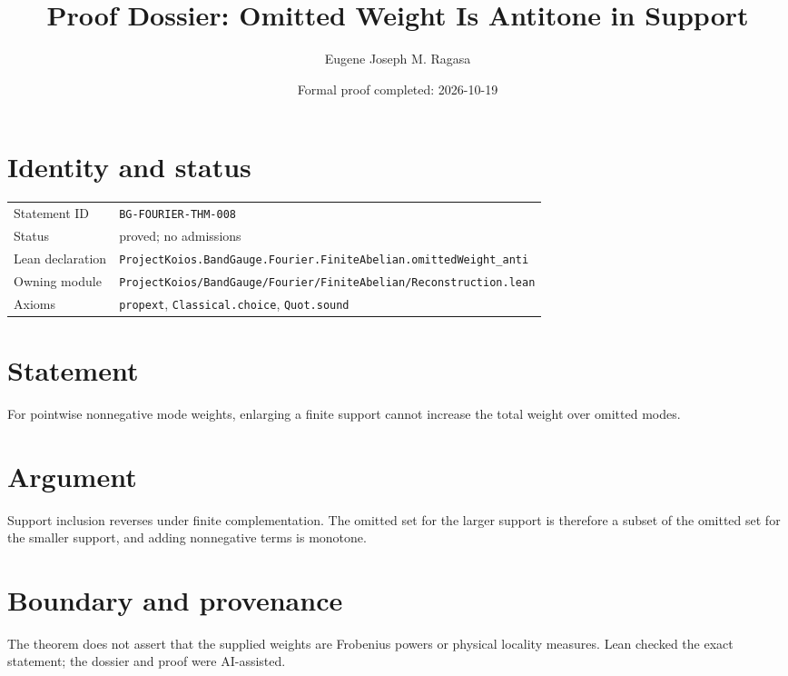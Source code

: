 \documentclass[11pt]{article}
\title{Proof Dossier: Omitted Weight Is Antitone in Support}
\author{Eugene Joseph M. Ragasa}
\date{Formal proof completed: 2026-10-19}
\begin{document}
\maketitle
\section{Identity and status}
\begin{tabularx}{\textwidth}{@{}lX@{}}\toprule
Statement ID & \texttt{BG-FOURIER-THM-008} \\
Status & proved; no admissions \\
Lean declaration & \texttt{ProjectKoios.BandGauge.Fourier.FiniteAbelian.}\newline\texttt{omittedWeight\_anti} \\
Owning module & \texttt{ProjectKoios/BandGauge/Fourier/FiniteAbelian/Reconstruction.lean} \\
Axioms & \texttt{propext}, \texttt{Classical.choice}, \texttt{Quot.sound} \\
\bottomrule\end{tabularx}
\section{Statement}
For pointwise nonnegative mode weights, enlarging a finite support cannot increase the total weight over omitted modes.
\section{Argument}
Support inclusion reverses under finite complementation. The omitted set for the larger support is therefore a subset of the omitted set for the smaller support, and adding nonnegative terms is monotone.
\section{Boundary and provenance}
The theorem does not assert that the supplied weights are Frobenius powers or physical locality measures. Lean checked the exact statement; the dossier and proof were AI-assisted.
\end{document}

